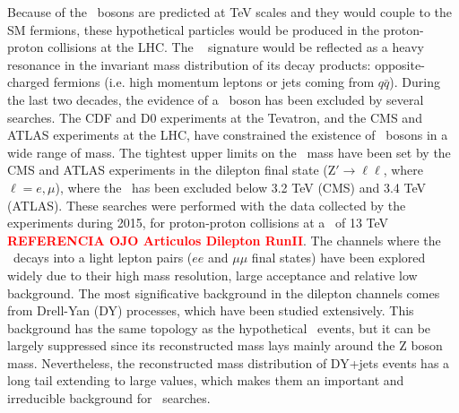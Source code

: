 
Because of the \Zprime~bosons are predicted at TeV scales and they would couple to the SM fermions, 
these hypothetical particles would be produced in the proton-proton collisions at the LHC. The \Zprime~ 
signature would be reflected as a heavy resonance in the invariant mass distribution of its 
decay products: opposite-charged fermions (i.e. high momentum leptons or jets coming from $q\bar{q}$). During 
the last two decades, the evidence of a \Zprime~boson has been excluded by several searches. 
The CDF \cite{CDFZprimedielectronbib,CDFZprimedimuonbib,CDFZprimeditaubib,CDFZprimeditopbib}  
and D0 \cite{D0Zprimesearchesbib,D0Zprimetodielectronbib,D0Zprimeditopbib} experiments at the Tevatron, and
the CMS \cite{CMSZprime2dileptonbib,CMSZprime2ditaubib,CMSZprime2tausRunII,CMSZprime2ditauelectronmuonbib,CMSZprime2toptop,CMSZprime2bbbib,CMSZprime2dijetbib}
and ATLAS \cite{ATLASZprime2dileptonbib,ATLASZprime2ditaubib,ATLASZprime2toptopbib, ATLAS_Zprime2tausRunII} experiments at the LHC, have 
constrained the existence of \Zprime~bosons in a wide range of mass. The tightest 
upper limits on the \Zprime~mass have been set by the CMS and ATLAS experiments in the dilepton final 
state (Z$'\rightarrow \ell\ell$, where $\ell=e, \mu$), where the \ZprimeSSM~has been excluded below 3.2 TeV (CMS) and 3.4 TeV (ATLAS). These 
searches were performed with the data collected by the experiments during 2015, for proton-proton 
collisions at a \centermassenergy~of 13 TeV \textbf{\textcolor{red}{REFERENCIA OJO Articulos Dilepton RunII}}. The channels
where the \Zprime~decays into a light lepton pairs ($ee$ and $\mu\mu$ final states) have been explored
widely due to their high mass resolution, large acceptance and relative low background. The most significative 
background in the dilepton channels comes from Drell-Yan (DY) processes, which have been studied extensively. This 
background has the same topology as the hypothetical \Zprime~events, but it can be largely 
suppressed since its reconstructed mass lays mainly around the Z boson mass. Nevertheless, the 
reconstructed mass distribution of DY+jets events has a long tail extending to large values, which 
makes them an important and irreducible background for \Zprime~searches.  \\

